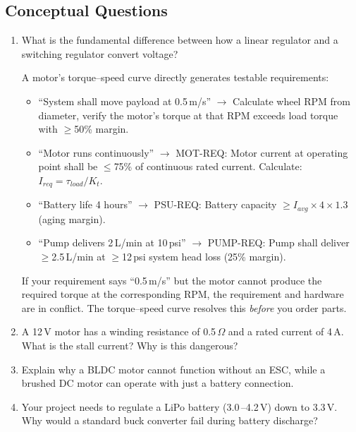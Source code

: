 \subsection{Conceptual Questions}

\begin{enumerate}[leftmargin=1.5em]
  \item What is the fundamental difference between how a linear regulator and a switching regulator convert voltage?

\begin{keyconceptbox}
A motor's torque--speed curve directly generates testable requirements:
\begin{itemize}[nosep,leftmargin=1.5em]
\item ``System shall move payload at 0.5\,m/s'' $\to$ Calculate wheel RPM from diameter, verify the motor's torque at that RPM exceeds load torque with $\geq$50\% margin.
\item ``Motor runs continuously'' $\to$ MOT-REQ: Motor current at operating point shall be $\leq$75\% of continuous rated current. Calculate: $I_{req} = \tau_{load} / K_t$.
\item ``Battery life 4 hours'' $\to$ PSU-REQ: Battery capacity $\geq I_{avg} \times 4 \times 1.3$ (aging margin).
\item ``Pump delivers 2\,L/min at 10\,psi'' $\to$ PUMP-REQ: Pump shall deliver $\geq$2.5\,L/min at $\geq$12\,psi system head loss (25\% margin).
\end{itemize}
If your requirement says ``0.5\,m/s'' but the motor cannot produce the required torque at the corresponding RPM, the requirement and hardware are in conflict. The torque--speed curve resolves this \emph{before} you order parts.
\end{keyconceptbox}

  \item A 12\,V motor has a winding resistance of 0.5\,$\Omega$ and a rated current of 4\,A. What is the stall current? Why is this dangerous?

  \item Explain why a BLDC motor cannot function without an ESC, while a brushed DC motor can operate with just a battery connection.

  \item Your project needs to regulate a LiPo battery (3.0\,--4.2\,V) down to 3.3\,V. Why would a standard buck converter fail during battery discharge?


\end{enumerate}
